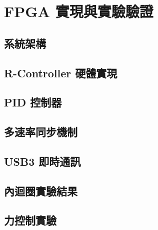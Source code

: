 \chapter{FPGA 實現與實驗驗證}
\label{c:implementation}

\section{系統架構}
\label{sec:fpga_arch}


\section{R-Controller 硬體實現}
\label{sec:r_ctrl_hw}


\section{PID 控制器}
\label{sec:pid_hw}


\section{多速率同步機制}
\label{sec:multirate_sync}


\section{USB3 即時通訊}
\label{sec:usb3_comm}


\section{內迴圈實驗結果}
\label{sec:inner_loop_exp}


\section{力控制實驗}
\label{sec:force_ctrl_exp}

